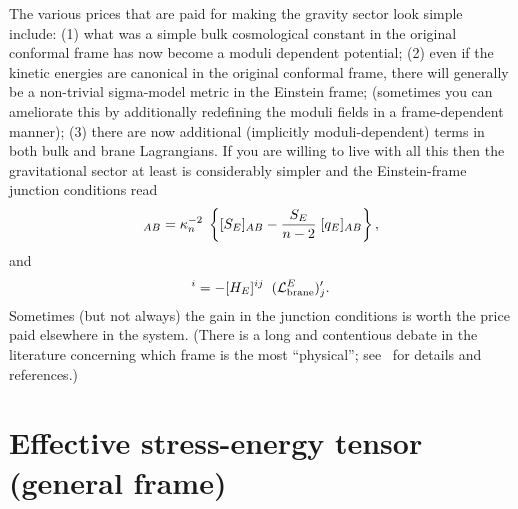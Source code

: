 \documentclass[a4paper,10pt]{article}
\begin{document}
The various prices that are paid for making the gravity sector look
simple include: (1) what was a simple bulk cosmological constant in
the original conformal frame has now become a moduli dependent
potential; (2) even if the kinetic energies are canonical in the
original conformal frame, there will generally be a non-trivial
sigma-model metric in the Einstein frame; (sometimes you can
ameliorate this by additionally redefining the moduli fields in a
frame-dependent manner); (3) there are now additional (implicitly
moduli-dependent) terms in both bulk and brane Lagrangians. If you are
willing to live with all this then the gravitational sector at least
is considerably simpler and the Einstein-frame junction conditions
read
%
\begin{equation}
[\K_E]_{AB}
=
\kappa_n^{-2} \; \left\{
[S_E]_{AB}-{S_E \over n-2 } \; [q_E]_{AB}
\right\},
\label{E:k-einstein-frame}
\end{equation}
%
and
%
\begin{equation}
[J_E]^i= - [H_E]^{ij} \;\; (\L_\brane^E)'_j.
\label{E:j-phi-einstein-frame}
\end{equation}
%
Sometimes (but not always) the gain in the junction conditions is
worth the price paid elsewhere in the system. (There is a long and
contentious debate in the literature concerning which frame is the
most ``physical''; see~\cite{conformal-frames} for details and
references.)



\section{Effective stress-energy tensor (general frame)}
\label{S:effective}
\setcounter{equation}{0}
\end{document}
